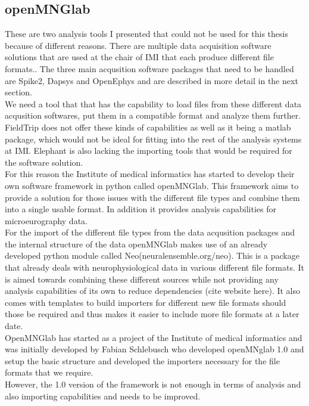 \subsection{openMNGlab}
These are two analysis tools I presented that could not be used for this thesis  because of different reasons.
There are multiple data acquisition software solutions that are used at the chair of IMI that each produce different file formats.. The three main acqusition software packages that need to be handled are Spike2, Dapsys and OpenEphys and are described in more detail in the next section. \\ 
We need a tool that that has the capability to load files from these different data acqusition softwares, put them in a compatible format and analyze them further.  FieldTrip does not offer these kinds of capabilities as well as it being a matlab package, which would not be ideal for fitting into the rest of the analysis systems at IMI. Elephant is also lacking the importing tools that would be required for the software solution.  \\
For this reason the Institute of medical informatics has started to develop their own software framework in python called openMNGlab.  This framework aims to provide a solution for those issues with the different file types and combine them into a single usable format.  In addition it provides analysis capabilities for microeurography data. \\
For the import of the different file types from the data acqusition packages and the internal structure of the data openMNGlab makes use of an already developed python module called Neo(neuralensemble.org/neo). This is a package that already deals with neurophysiological data in various different file formats. It is aimed towards combining these different sources while not providing any analysis capabilities of its own to reduce dependencies (cite website here). It also comes with templates to build importers for different new file formats should those be required and thus makes it easier to include more file formats at a later date.\\
OpenMNGlab has started as a project of the Institute of medical informatics and was initially developed by Fabian Schlebusch who developed openMNglab 1.0 and setup the basic structure and developed the importers necessary for the file formats that we require. \\
However, the 1.0 version of the framework is not enough in terms of analysis and also importing capabilities and needs to be improved. 

